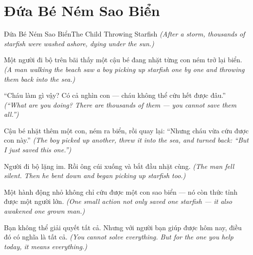 \section{Đứa Bé Ném Sao Biển}
\begin{truyen}{Đứa Bé Ném Sao Biển}{The Child Throwing Starfish}
\textit{(After a storm, thousands of starfish were washed ashore, dying under the sun.)}

Một người đi bộ trên bãi thấy một cậu bé đang nhặt từng con ném trở lại biển.
\textit{(A man walking the beach saw a boy picking up starfish one by one and throwing them back into the sea.)}

``Cháu làm gì vậy? Có cả nghìn con — cháu không thể cứu hết được đâu.''
\textit{(``What are you doing? There are thousands of them — you cannot save them all.'')}

Cậu bé nhặt thêm một con, ném ra biển, rồi quay lại: ``Nhưng cháu vừa cứu được con này.''
\textit{(The boy picked up another, threw it into the sea, and turned back: ``But I just saved this one.'')}

Người đi bộ lặng im. Rồi ông cúi xuống và bắt đầu nhặt cùng.
\textit{(The man fell silent. Then he bent down and began picking up starfish too.)}

Một hành động nhỏ không chỉ cứu được một con sao biển — nó còn thức tỉnh được một người lớn.
\textit{(One small action not only saved one starfish — it also awakened one grown man.)}

\end{truyen}

\begin{baihoc}
Bạn không thể giải quyết tất cả. Nhưng với người bạn giúp được hôm nay, điều đó có nghĩa là tất cả.
\textit{(You cannot solve everything. But for the one you help today, it means everything.)}
\end{baihoc}
\ngancach


